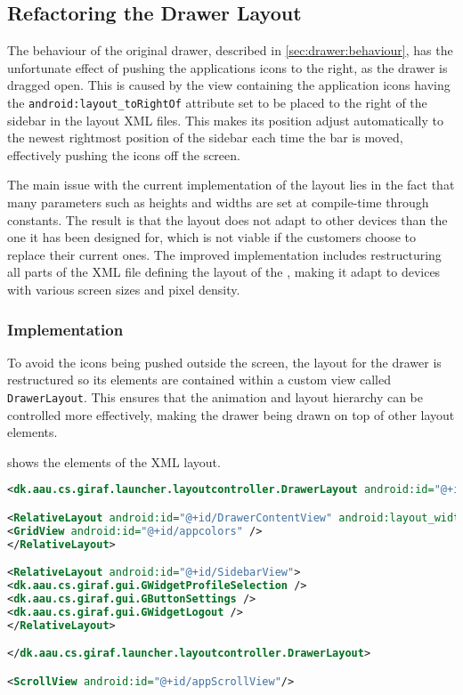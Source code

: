 \subsection{Refactoring the Drawer Layout}
The behaviour of the original drawer, described in \cref{sec:drawer:behaviour}, has the unfortunate effect of pushing the applications icons to the right, as the drawer is dragged open.
This is caused by the view containing the application icons having the  \lstinline{android:layout_toRightOf} attribute set to be placed to the right of the sidebar in the layout XML files.
This makes its position adjust automatically to the newest rightmost position of the sidebar each time the bar is moved, effectively pushing the icons off the screen.

The main issue with the current implementation of the \homeactivity layout lies in the fact that many parameters such as heights and widths are set at compile-time through constants.
The result is that the layout does not adapt to other devices than the one it has been designed for, which is not viable if the customers choose to replace their current ones.
The improved implementation includes restructuring all parts of the XML file defining the layout of the \homeactivity, making it adapt to devices with various screen sizes and pixel density.

\subsubsection{Implementation}\label{sec:sidebarlayout:xml}
To avoid the icons being pushed outside the screen, the layout for the drawer is restructured so its elements are contained within a custom view called \lstinline|DrawerLayout|.
This ensures that the animation and layout hierarchy can be controlled more effectively, making the drawer being drawn on top of other layout elements.

 shows the elements of the XML layout.

\begin{lstlisting}[caption={Structure of the XML layout of the drawer. Note that some attributes are omitted.},label={lst:sidebarlayout}, language=XML]
<dk.aau.cs.giraf.launcher.layoutcontroller.DrawerLayout android:id="@+id/DrawerView" android:layout_marginLeft="-400dp">

<RelativeLayout android:id="@+id/DrawerContentView" android:layout_width="400dp">
<GridView android:id="@+id/appcolors" />
</RelativeLayout>

<RelativeLayout android:id="@+id/SidebarView">
<dk.aau.cs.giraf.gui.GWidgetProfileSelection />
<dk.aau.cs.giraf.gui.GButtonSettings />
<dk.aau.cs.giraf.gui.GWidgetLogout />
</RelativeLayout>

</dk.aau.cs.giraf.launcher.layoutcontroller.DrawerLayout>

<ScrollView android:id="@+id/appScrollView"/>
\end{lstlisting}

